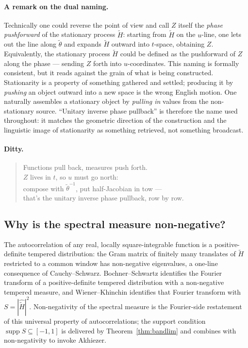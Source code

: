 \documentclass[11pt]{article}
\DeclareMathOperator{\supp}{supp}
\begin{document}
\paragraph{A remark on the dual naming.}
Technically one could reverse the point of view and call $Z$ itself the \emph{phase pushforward} of the stationary process $\tilde H$: starting from $\tilde H$ on the $u$-line, one lets out the line along $\tilde\theta$ and expands $\tilde H$ outward into $t$-space, obtaining $Z$. Equivalently, the stationary process $\tilde H$ could be defined as the pushforward of $Z$ along the phase --- sending $Z$ forth into $u$-coordinates. This naming is formally consistent, but it reads against the grain of what is being constructed. Stationarity is a property of something gathered and settled; producing it by \emph{pushing} an object outward into a new space is the wrong English motion. One naturally assembles a stationary object by \emph{pulling in} values from the non-stationary source. ``Unitary inverse phase pullback'' is therefore the name used throughout: it matches the geometric direction of the construction and the linguistic image of stationarity as something retrieved, not something broadcast.

\paragraph{Ditty.}
\begin{quote}
Functions pull back, measures push forth.\\
$Z$ lives in $t$, so $u$ must go north:\\
compose with $\tilde\theta^{-1}$, put half-Jacobian in tow ---\\
that's the unitary inverse phase pullback, row by row.
\end{quote}

\subsection{Why is the spectral measure non-negative?}\label{app:PSD-colloquial}

The autocorrelation of any real, locally square-integrable function is a positive-definite tempered distribution: the Gram matrix of finitely many translates of $\tilde H$ restricted to a common window has non-negative eigenvalues, a one-line consequence of Cauchy--Schwarz. Bochner--Schwartz identifies the Fourier transform of a positive-definite tempered distribution with a non-negative tempered measure, and Wiener--Khinchin identifies that Fourier transform with $S=|\widehat{\tilde H}|^2$. Non-negativity of the spectral measure is the Fourier-side restatement of this universal property of autocorrelations; the support condition $\supp S\subseteq[-1,1]$ is delivered by Theorem~\ref{thm:bandlim} and combines with non-negativity to invoke Akhiezer.
\end{document}
